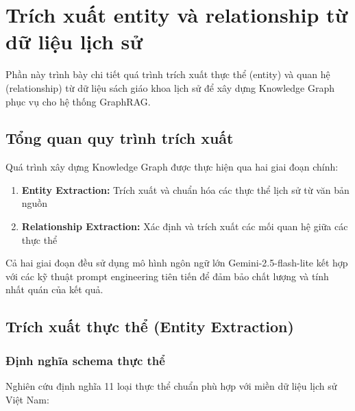 \section{Trích xuất entity và relationship từ dữ liệu lịch sử}
\label{sec:experiment3}

Phần này trình bày chi tiết quá trình trích xuất thực thể (entity) và quan hệ (relationship) từ dữ liệu sách giáo khoa lịch sử để xây dựng Knowledge Graph phục vụ cho hệ thống GraphRAG.

\subsection{Tổng quan quy trình trích xuất}

Quá trình xây dựng Knowledge Graph được thực hiện qua hai giai đoạn chính:
\begin{enumerate}
    \item \textbf{Entity Extraction:} Trích xuất và chuẩn hóa các thực thể lịch sử từ văn bản nguồn
    \item \textbf{Relationship Extraction:} Xác định và trích xuất các mối quan hệ giữa các thực thể
\end{enumerate}

Cả hai giai đoạn đều sử dụng mô hình ngôn ngữ lớn Gemini-2.5-flash-lite kết hợp với các kỹ thuật prompt engineering tiên tiến để đảm bảo chất lượng và tính nhất quán của kết quả.

\subsection{Trích xuất thực thể (Entity Extraction)}

\subsubsection{Định nghĩa schema thực thể}

Nghiên cứu định nghĩa 11 loại thực thể chuẩn phù hợp với miền dữ liệu lịch sử Việt Nam:

